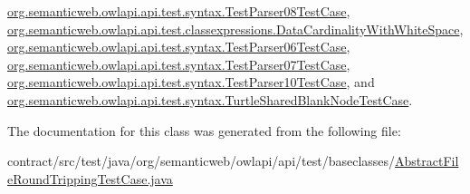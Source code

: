 \hyperlink{classorg_1_1semanticweb_1_1owlapi_1_1api_1_1test_1_1syntax_1_1_test_parser08_test_case_a3e0b22aa02b10d86e4045c6e61fcb309}{org.\-semanticweb.\-owlapi.\-api.\-test.\-syntax.\-Test\-Parser08\-Test\-Case}, \hyperlink{classorg_1_1semanticweb_1_1owlapi_1_1api_1_1test_1_1classexpressions_1_1_data_cardinality_with_white_space_ae872299a011bfe391fa17aec25145ea0}{org.\-semanticweb.\-owlapi.\-api.\-test.\-classexpressions.\-Data\-Cardinality\-With\-White\-Space}, \hyperlink{classorg_1_1semanticweb_1_1owlapi_1_1api_1_1test_1_1syntax_1_1_test_parser06_test_case_a68981ecf4ed6f3d02d90de00f77c03ad}{org.\-semanticweb.\-owlapi.\-api.\-test.\-syntax.\-Test\-Parser06\-Test\-Case}, \hyperlink{classorg_1_1semanticweb_1_1owlapi_1_1api_1_1test_1_1syntax_1_1_test_parser07_test_case_a4a4197478c91bfa679460adb57635cc1}{org.\-semanticweb.\-owlapi.\-api.\-test.\-syntax.\-Test\-Parser07\-Test\-Case}, \hyperlink{classorg_1_1semanticweb_1_1owlapi_1_1api_1_1test_1_1syntax_1_1_test_parser10_test_case_a82b18878fb364295d73349ce5c808fff}{org.\-semanticweb.\-owlapi.\-api.\-test.\-syntax.\-Test\-Parser10\-Test\-Case}, and \hyperlink{classorg_1_1semanticweb_1_1owlapi_1_1api_1_1test_1_1syntax_1_1_turtle_shared_blank_node_test_case_aa27ed4ea09a1e09c033b0f72cae1c8ea}{org.\-semanticweb.\-owlapi.\-api.\-test.\-syntax.\-Turtle\-Shared\-Blank\-Node\-Test\-Case}.



The documentation for this class was generated from the following file\-:\begin{DoxyCompactItemize}
\item 
contract/src/test/java/org/semanticweb/owlapi/api/test/baseclasses/\hyperlink{_abstract_file_round_tripping_test_case_8java}{Abstract\-File\-Round\-Tripping\-Test\-Case.\-java}\end{DoxyCompactItemize}
